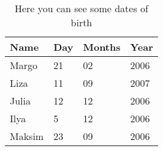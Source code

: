 \begin{table}[htbp]
\centering
\begin{tabular}{|l|l|l|l|}
\hline
Name   & Day & Months & Year \\ \hline
Margo  & 21  & 02     & 2006 \\ \hline
Liza   & 11  & 09     & 2007 \\ \hline
Julia  & 12  & 12     & 2006 \\ \hline
Ilya   & 5   & 12     & 2006 \\ \hline
Maksim & 23  & 09     & 2006 \\ \hline
\end{tabular}
\label{tab:birthdays}
\caption{Here you can see some dates of birth}
\end{table}